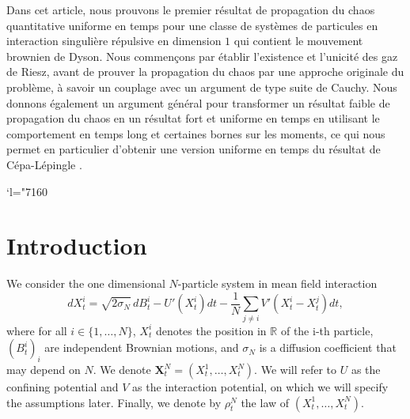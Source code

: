 \documentclass[JEP,XML,SOM,Unicode,published]{cedram}
\newcommand{\Changel}{\mathcode`l="7160}
\newcommand{\bX}{{\boldsymbol{X}}}
\theoremstyle{plain}
\theoremstyle{definition}
\begin{document}


\begin{altabstract}
Dans cet article, nous prouvons le premier résultat de propagation du chaos quantitative uniforme en temps pour une classe de systèmes de particules en interaction singulière répulsive en dimension $1$ qui contient le mouvement brownien de Dyson. Nous commençons par établir l'existence et l'unicité des gaz de Riesz, avant de prouver la propagation du chaos par une approche originale du problème, à savoir un couplage avec un argument de type suite de Cauchy. Nous donnons également un argument général pour transformer un résultat faible de propagation du chaos en un résultat fort et uniforme en temps en utilisant le comportement en temps long et certaines bornes sur les moments, ce qui nous permet en particulier d'obtenir une version uniforme en temps du résultat de Cépa-Lépingle \cite{cepa_lepingle}.
\end{altabstract}

\maketitle
\vspace*{-\baselineskip}
\tableofcontents

\Changel

\section{Introduction}

We consider the one dimensional $N$-particle system in mean field interaction\vspace*{-3pt}
\begin{equation}\label{particle_system}
dX^i_t=\sqrt{2\sigma_N}\,dB^i_t-U'\left(X^i_t\right)dt-\frac{1}{N}\sum_{j\neq i}V'(X^i_t-X^j_t)dt,
\end{equation}
where for all $i\in\{1,\dots,N\}$, $X^i_t$ denotes the position in $\mathbb{R}$ of the i-th particle, $(B^i_t)_i$ are independent Brownian motions, and $\sigma_N$ is a diffusion coefficient that may depend on $N$. We denote $\bX^N_t=\left(X^1_t,\dots,X^N_t\right)$. We will refer to $U$ as the confining potential and $V$ as the interaction potential, on which we will specify the assumptions later. Finally, we denote by $\rho^N_t$ the law of $(X^1_t,\dots,X^N_t)$.
\end{document}
